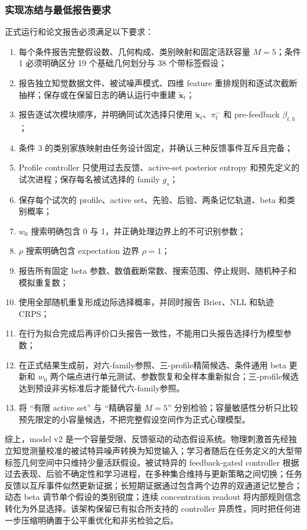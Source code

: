 \subsubsection{实现冻结与最低报告要求}

正式运行和论文报告必须满足以下要求：
\begin{enumerate}
    \item 每个条件报告完整假设数、几何构成、类别映射和固定活跃容量 $M=5$；条件 1 必须明确区分 19 个基础几何划分与 38 个带标签假设；
    \item 报告独立知觉数据文件、被试噪声模式、四维 feature 重排规则和逐试次截断抽样；保存或在保留日志的确认运行中重建 $\widetilde{\mathbf x}_t$；
    \item 报告逐试次模块顺序，并明确同试次选择只使用 $\widetilde{\mathbf x}_t$、$\pi_t^-$ 和 pre-feedback $\beta_{t,h}$；
    \item 条件 3 的类别家族映射由任务设计固定，并确认三种反馈事件互斥且完备；
    \item Profile controller 只使用过去反馈、active-set posterior entropy 和预先定义的试次进程；保存每名被试选择的 family $g_s$；
    \item 保存每个试次的 profile、active set、先验、后验、两条记忆轨道、beta 和类别概率；
    \item $w_0$ 搜索明确包含 0 与 1，并正确处理边界上的不可识别参数；
    \item $\rho$ 搜索明确包含 expectation 边界 $\rho=1$；
    \item 报告所有固定 beta 参数、数值截断常数、搜索范围、停止规则、随机种子和模拟重复数；
    \item 使用全部随机重复形成边际选择概率，并同时报告 Brier、NLL 和轨迹 CRPS；
    \item 在行为拟合完成后再评价口头报告一致性，不能用口头报告选择行为模型参数；
    \item 在正式结果生成前，对六-family参照、三-profile精简候选、条件通用 beta 更新和 $w_0$ 两个端点进行单元测试、参数恢复和全样本重新拟合；三-profile候选达到预设非劣标准后才能替代六-family参照。
    \item 将 ``有限 active set'' 与 ``精确容量 $M=5$'' 分别检验；容量敏感性分析只比较预先限定的小容量候选，不把完整假设空间作为正式心理模型。
\end{enumerate}

综上，model v2 是一个容量受限、反馈驱动的动态假设系统。物理刺激首先经独立知觉测量校准的被试特异噪声转换为知觉输入；学习者随后在任务定义的大型带标签几何空间中只维持少量活跃假设。被试特异的 feedback-gated controller 根据过去表现、后验不确定性和学习进程，在多种集合维持与更新策略之间切换；任务反馈以互斥事件似然更新证据；长短期证据通过包含两个边界的双通道记忆整合；动态 beta 调节单个假设的类别锐度；连续 concentration readout 将内部规则信念转化为外显选择。该架构保留已有拟合所支持的 controller 异质性，同时把任何进一步压缩明确置于公平重优化和非劣检验之后。
